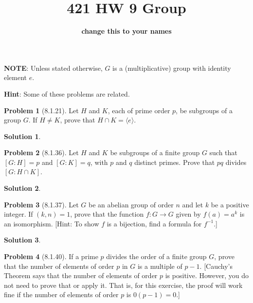 \documentclass[12pt]{article}
\theoremstyle{definition}
\newtheorem*{prob}{Problem}
\newtheorem*{soln}{Solution}
\begin{document}
%
\title{421 HW 9 Group}
\author{\textbf{change this to your names}}

\date{}

\maketitle

\textbf{NOTE}: Unless stated otherwise, $G$ is a (multiplicative) 
group with identity element $e$.

\textbf{Hint}: Some of these problems are related.

\begin{prob}[8.1.21]
Let $H$ and $K$, each of prime order $p$, be subgroups of a group $G$. 
If  $H \neq K$, prove that $H \cap K = \langle e \rangle$.
\end{prob}

\begin{soln}

\end{soln}

\begin{prob}[8.1.36]
Let $H$ and $K$ be subgroups of a finite group $G$ such that $[G:H] = p$ and $[G:K] = q$,
 with $p$ and $q$ distinct primes. Prove that $pq$ divides $[G:H \cap K]$.
\end{prob}

\begin{soln}

\end{soln}

\begin{prob}[8.1.37]
Let $G$ be an abelian group of order $n$ and let $k$ be a positive integer. 
If $(k, n) = 1$, prove that the function 
$f:G \to G$ given by $f(a)= a^k$ is an isomorphism. 
[Hint: To show $f$ is a bijection, find a formula for $f^{-1}$.]
\end{prob}

\begin{soln}

\end{soln}


\begin{prob}[8.1.40]
If  a prime $p$ divides the order of a finite group $G$, prove that the number of 
elements of order $p$ in $G$ is a multiple of  $p - 1$.
[Cauchy's Theorem says that the number of elements of order $p$ is positive.
However, you do not need to prove that or apply it. That is, for this exercise,
the proof will work fine if the number of elements of order $p$
is $0(p-1) = 0$.]
\end{prob}
\end{document}
